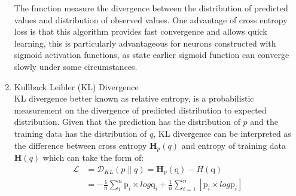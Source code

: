 \begin{enumerate}
The function measure the divergence between the distribution of predicted values and distribution of observed values. One advantage of cross entropy loss is that this algorithm provides fast convergence and allows quick learning, this is particularly advantageous for neurons constructed with sigmoid activation functions, as state earlier sigmoid function can converge slowly under some circumstances.\\
    \item Kullback Leibler (KL) Divergence\\
KL divergence better known as relative entropy, is a probabilistic measurement on the divergence of predicted distribution to expected distribution. Given that the prediction has the distribution of $p$ and the training data has the distribution of $q$, KL divergence can be interpreted as the difference between cross entropy $\mathbf{H}_p(q)$ and entropy of training data $\mathbf{H}(q)$ which can take the form of:
\begin{equation}
    \begin{aligned}
    \mathcal{L} &= \mathcal{D}_{KL}(p \parallel q) = \mathbf{H}_p(\mathrm{q}) - H(\mathrm{q}) \\
    &= - \frac {1}{n} \sum_i^n \mathrm{p}_i \times log \mathrm{q}_i + \frac{1}{n}\sum_{i=1}^n [\mathrm{p}_i \times log \mathrm{p}_i] 
    \end{aligned}
\end{equation}
\end {enumerate}
